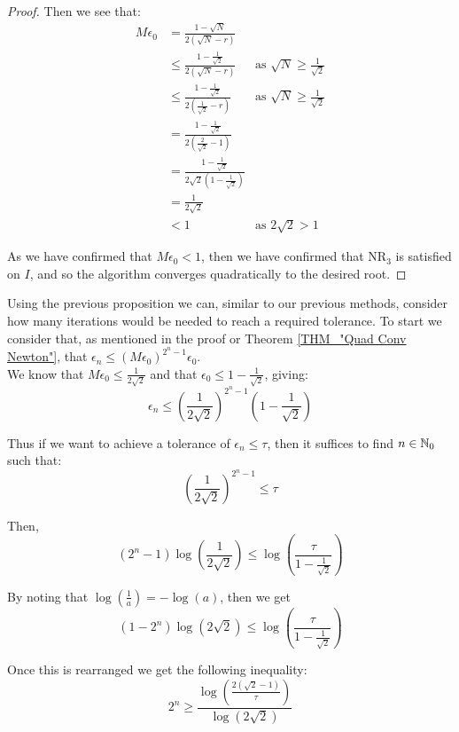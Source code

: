 \begin{proof}
Then we see that:
\begin{displaymath}
\begin{align*}
M\epsilon_0 &= \frac{1 - \sqrt{N}}{2(\sqrt{N} - r)}\\
	&\le \frac{1 - \frac{1}{\sqrt{2}}}{2(\sqrt{N} - r)} 
		& \textrm{as } \sqrt{N} \ge \frac{1}{\sqrt{2}}\\
	&\le \frac{1 - \frac{1}{\sqrt{2}}}{2(\frac{1}{\sqrt{2}}-r)}
		& \textrm{as } \sqrt{N} \ge \frac{1}{\sqrt{2}}\\
	&= \frac{1 - \frac{1}{\sqrt{2}}}{2(\frac{2}{\sqrt{2}} - 1)}\\
	&= \frac{1 - \frac{1}{\sqrt{2}}}{2\sqrt{2}(1-\frac{1}{\sqrt{2}})}\\
	&= \frac{1}{2\sqrt{2}}\\
	&< 1 & \textrm{as } 2\sqrt{2} > 1
\end{align*}
\end{displaymath}

As we have confirmed that \(M\epsilon_0 < 1\), then we have confirmed that \(\mathrm{NR}_3\) is satisfied on \(I\), and so the algorithm converges quadratically to the desired root.
\end{proof}

Using the previous proposition we can, similar to our previous methods, consider how many iterations would be needed to reach a required tolerance. To start we consider that, as mentioned in the proof or Theorem \ref{THM_"Quad Conv Newton"}, that \(\epsilon_n \le (M\epsilon_0)^{2^n - 1}\epsilon_0\).\\

We know that \(M\epsilon_0 \le \frac{1}{2\sqrt{2}}\) and that \(\epsilon_0 \le 1 - \frac{1}{\sqrt{2}}\), giving:
\[\epsilon_n \le \left(\frac{1}{2\sqrt{2}}\right)^{2^n - 1}\left(1 - \frac{1}{\sqrt{2}}\right)\]

Thus if we want to achieve a tolerance of \(\epsilon_n \le \tau\), then it suffices to find \(n \in \mathbb{N}_0\) such that:
\[\left(\frac{1}{2\sqrt{2}}\right)^{2^n - 1} \le \tau\]

Then,
\[(2^n - 1)\log\left(\frac{1}{2\sqrt{2}}\right) \le \log\left(\frac{\tau}{1 - \frac{1}{\sqrt{2}}}\right)\]

By noting that \(\log(\frac{1}{a}) = - \log(a)\), then we get
\[(1-2^n)\log(2\sqrt{2}) \le \log\left(\frac{\tau}{1 - \frac{1}{\sqrt{2}}}\right)\]

Once this is rearranged we get the following inequality:
\[2^n \ge \frac{\log\left(\frac{2(\sqrt{2} - 1)}{\tau}\right)}{\log(2\sqrt{2})}\]

